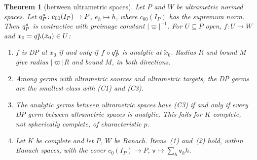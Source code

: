 \documentclass[11pt]{amsart}
\newtheorem{theorem}{Theorem}[section]
\theoremstyle{definition}
\theoremstyle{remark}
\numberwithin{equation}{section}
\newcommand{\abs}[1]{\lvert #1\rvert}
\theoremstyle{plain}
\theoremstyle{definition}
\theoremstyle{plain}
\begin{document}
\begin{theorem}[between ultrametric spaces]\label{dp:thm:ultrametric-minimal}
Let $P$ and $W$ be ultrametric normed spaces. Let $q^{\rm u}_P\colon c_{00}(I_P)\to P$, $e_h\mapsto h$, where $c_{00}(I_P)$ has the supremum norm. Then $q^{\rm u}_P$ is contractive with preimage constant $\abs\varpi^{-1}$. For $U\subseteq P$ open, $f\colon U\to W$ and $x_0=q^{\rm u}_P(\tilde x_0)\in U$:
\begin{enumerate}
\item $f$ is DP at $x_0$ if and only if $f\circ q^{\rm u}_P$ is analytic at $\tilde x_0$. Radius $R$ and bound $M$ give radius $\abs\varpi R$ and bound $M$, in both directions.
\item Among germs with ultrametric sources and ultrametric targets, the DP germs are the smallest class with (C1) and (C3).
\item The analytic germs between ultrametric spaces have (C3) if and only if every DP germ between ultrametric spaces is analytic. This fails for $K$ complete, not spherically complete, of characteristic $p$.
\item Let $K$ be complete and let $P$, $W$ be Banach. Items~(1) and~(2) hold, within Banach spaces, with the cover $c_0(I_P)\to P$, $\mathsf v\mapsto\sum_h\mathsf v_hh$.
\end{enumerate}
\end{theorem}
\end{document}
